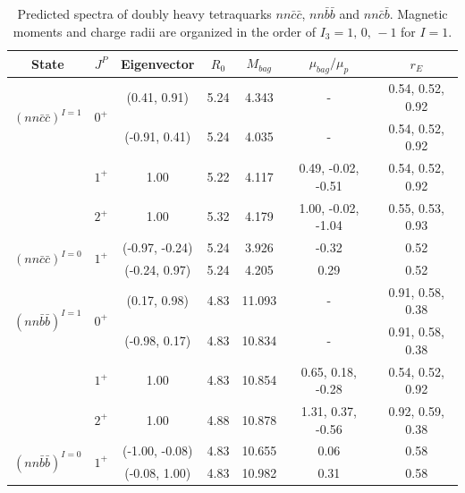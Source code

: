 \documentclass[prd,twocolumn,floatfix,nofootinbib]{revtex4}
\begin{document}
\renewcommand{\tabcolsep}{0.59cm}
\renewcommand{\arraystretch}{1.2}
\begin{table}[!htbp]
    \caption{Predicted spectra of doubly heavy tetraquarks $nn\bar{c}\bar{c}$, $nn\bar{b}\bar{b}$ and $nn\bar{c}\bar{b}$. 
    Magnetic moments and charge radii are organized in the order of $I_{3}=1,\,0,\,-1$ for $I=1$.}
    \label{tab:2heavytetraquark1}
    \begin{tabular}{ccccccc}
        \hline\hline
        {\rm State}     &$J^{P}$    &{\rm Eigenvector}      &$R_{0}$    &$M_{bag}$  &$\mu_{bag}/\mu_{p}$    &$r_{E}$ \\ \hline
        \multirow{2}{*}{${(nn\bar{c}\bar{c})}^{I=1}$}
                        &\multirow{2}{*}{$0^{+}$}
                                    &(0.41, 0.91)           &5.24	    &4.343	    &-                      &0.54, 0.52, 0.92 \\ 
                        &           &(-0.91, 0.41)          &5.24	    &4.035	    &-                      &0.54, 0.52, 0.92 \\ 
                        &$1^{+}$    &1.00                   &5.22	    &4.117	    &0.49, -0.02, -0.51     &0.54, 0.52, 0.92 \\ 
                        &$2^{+}$    &1.00                   &5.32	    &4.179	    &1.00, -0.02, -1.04     &0.55, 0.53, 0.93 \\ 
        \multirow{2}{*}{${(nn\bar{c}\bar{c})}^{I=0}$}
                        &\multirow{2}{*}{$1^{+}$}
                                    &(-0.97, -0.24)         &5.24	    &3.926	    &-0.32                  &0.52 \\ 
                        &           &(-0.24, 0.97)          &5.24	    &4.205	    &0.29                   &0.52 \\ 
        \multirow{2}{*}{${(nn\bar{b}\bar{b})}^{I=1}$}
                        &\multirow{2}{*}{$0^{+}$}
                                    &(0.17, 0.98)           &4.83	    &11.093	    &-                      &0.91, 0.58, 0.38 \\ 
                        &           &(-0.98, 0.17)          &4.83	    &10.834	    &-                      &0.91, 0.58, 0.38 \\ 
                        &$1^{+}$    &1.00                   &4.83	    &10.854	    &0.65, 0.18, -0.28      &0.54, 0.52, 0.92 \\ 
                        &$2^{+}$    &1.00                   &4.88	    &10.878	    &1.31, 0.37, -0.56      &0.92, 0.59, 0.38 \\ 
        \multirow{2}{*}{${(nn\bar{b}\bar{b})}^{I=0}$}
                        &\multirow{2}{*}{$1^{+}$}
                                    &(-1.00, -0.08)         &4.83	    &10.655	    &0.06                   &0.58 \\ 
                        &           &(-0.08, 1.00)          &4.83	    &10.982	    &0.31                   &0.58 \\ 


\end{tabular}
\end{table}
\end{document}

